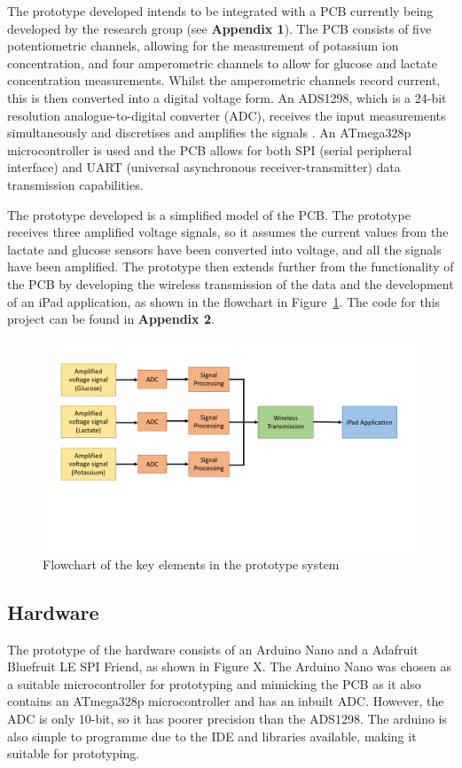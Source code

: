 The prototype developed intends to be integrated with a PCB currently being developed by the research group (see \textbf{Appendix 1}). The PCB consists of five potentiometric channels, allowing for the measurement of potassium ion concentration, and four amperometric channels to allow for glucose and lactate concentration measurements. Whilst the amperometric channels record current, this is then converted into a digital voltage form. An ADS1298, which is a 24-bit resolution analogue-to-digital converter (ADC), receives the input measurements simultaneously and discretises and amplifies the signals \cite{TexasInstruments2010}. An ATmega328p microcontroller is used and the PCB allows for both SPI (serial peripheral interface) and UART (universal asynchronous receiver-transmitter) data transmission capabilities.

The prototype developed is a simplified model of the PCB. The prototype receives three amplified voltage signals, so it assumes the current values from the lactate and glucose sensors have been converted into voltage, and all the signals have been amplified. The prototype then extends further from the functionality of the PCB by developing the wireless transmission of the data and the development of an iPad application, as shown in the flowchart in Figure~\ref{fig: flowchart}. The code for this project can be found in  \textbf{Appendix 2}.

\begin{figure}[H]
\centering
\includegraphics[trim={0cm 6cm 0.5cm  2cm}, clip, width=1\textwidth]{./figures/Flowchart.pdf}
\captionsetup{justification=centering}
\caption{Flowchart of the key elements in the prototype system}
\label{fig: flowchart}
\end{figure}



\subsection{Hardware}
The prototype of the hardware consists of an Arduino Nano and a Adafruit Bluefruit LE SPI Friend, as shown in Figure X. The Arduino Nano was chosen as a suitable microcontroller for prototyping and mimicking the PCB as it also contains an ATmega328p microcontroller and has an inbuilt ADC. However, the ADC is only 10-bit, so it has poorer precision than the ADS1298. The arduino is also simple to programme due to the IDE and libraries available, making it suitable for prototyping.

